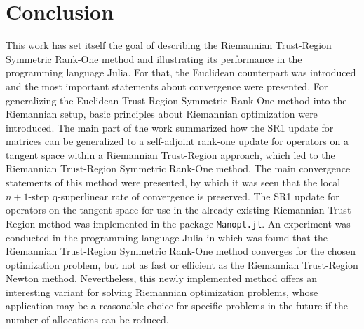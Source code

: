 \chapter{Conclusion}

This work has set itself the goal of describing the Riemannian Trust-Region Symmetric Rank-One method and illustrating its performance in the programming language Julia. For that, the Euclidean counterpart was introduced and the most important statements about convergence were presented. For generalizing the Euclidean Trust-Region Symmetric Rank-One method into the Riemannian setup, basic principles about Riemannian optimization were introduced. The main part of the work summarized how the SR1 update for matrices can be generalized to a self-adjoint rank-one update for operators on a tangent space within a Riemannian Trust-Region approach, which led to the Riemannian Trust-Region Symmetric Rank-One method. The main convergence statements of this method were presented, by which it was seen that the local $n + 1$-step q-superlinear rate of convergence is preserved. The SR1 update for operators on the tangent space for use in the already existing Riemannian Trust-Region method was implemented in the package \lstinline!Manopt.jl!. An experiment was conducted in the programming language Julia in which was found that the Riemannian Trust-Region Symmetric Rank-One method converges for the chosen optimization problem, but not as fast or efficient as the Riemannian Trust-Region Newton method. Nevertheless, this newly implemented method offers an interesting variant for solving Riemannian optimization problems, whose application may be a reasonable choice for specific problems in the future if the number of allocations can be reduced. 